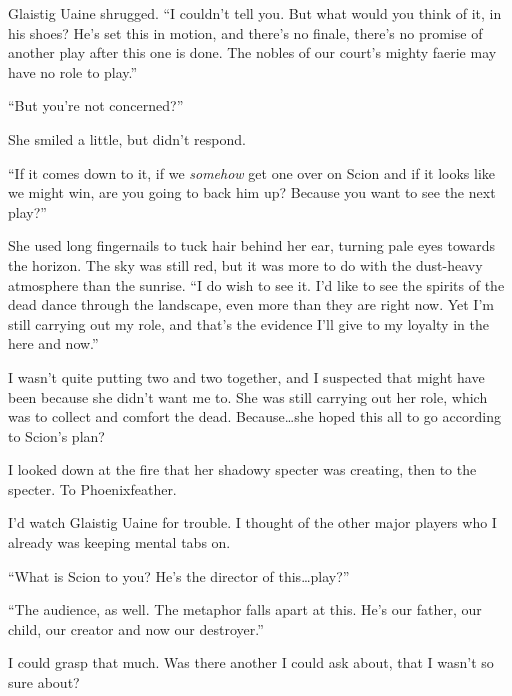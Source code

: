 Glaistig Uaine shrugged.  ``I couldn't tell you.  But what would you think of it, in his shoes?  He's set this in motion, and there's no finale, there's no promise of another play after this one is done.  The nobles of our court's mighty faerie may have no role to play.''



``But you're not concerned?''



She smiled a little, but didn't respond.



``If it comes down to it, if we \emph{somehow }get one over on Scion and if it looks like we might win, are you going to back him up?  Because you want to see the next play?''



She used long fingernails to tuck hair behind her ear, turning pale eyes towards the horizon.  The sky was still red, but it was more to do with the dust-heavy atmosphere than the sunrise.  ``I do wish to see it.  I'd like to see the spirits of the dead dance through the landscape, even more than they are right now.  Yet I'm still carrying out my role, and that's the evidence I'll give to my loyalty in the here and now.''



I wasn't quite putting two and two together, and I suspected that might have been because she didn't want me to.  She was still carrying out her role, which was to collect and comfort the dead.  Because\ldots she hoped this all to go according to Scion's plan?



I looked down at the fire that her shadowy specter was creating, then to the specter.  To Phoenixfeather.



I'd watch Glaistig Uaine for trouble.  I thought of the other major players who I already was keeping mental tabs on.



``What is Scion to you?  He's the director of this\ldots play?''



``The audience, as well.  The metaphor falls apart at this.  He's our father, our child, our creator and now our destroyer.''



I could grasp that much.  Was there another I could ask about, that I wasn't so sure about?



